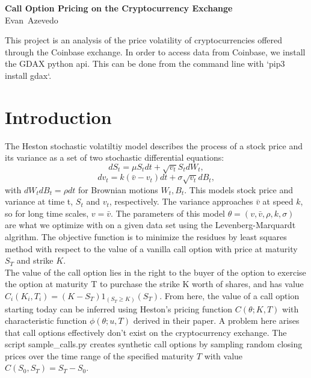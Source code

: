 \documentclass[12pt]{article}
\newcommand\thisis{Call Option Pricing on the Cryptocurrency Exchange}
\newcommand\theauthor{Evan~Azevedo}
\begin{document}
\thispagestyle{firstpg}

\noindent
{\sffamily\bfseries\huge \thisis}\\

\noindent
{\large\sffamily \theauthor}

\vspace*{20bp}

\noindent
This project is an analysis of the price volatility of cryptocurrencies offered through the Coinbase exchange.
In order to access data from Coinbase, we install the GDAX python api.
This can be done from the command line with `pip3 install gdax`.

\section{Introduction}
The Heston stochastic volatiltiy model describes the process of a stock price and its variance as a set of two stochastic differential equations:
\begin{equation}\label{eq:dS}
dS_{t} = \mu S_{t} dt + \sqrt{v_{t}} S_{t} dW_{t}, 
\end{equation}
\begin{equation}\label{eq:dv}
dv_{t} = k(\bar{v} - v_{t})dt + \sigma \sqrt{v_{t}} dB_{t},
\end{equation}
\noindent
with $dW_{t} dB_{t} = \rho dt$ for Brownian motions $W_t, B_t$.
This models stock price and variance at time t, $S_{t}$ and $v_{t}$, respectively.
The variance approaches $\bar{v}$ at speed $k$, so for long time scales, $v = \bar{v}$.
The parameters of this model $\theta = (v, \bar{v}, \rho, k, \sigma)$ are what we optimize with on a given data set using the Levenberg-Marquardt algrithm.
The objective function is to minimize the residues by least squares method with respect to the value of a vanilla call option with price at maturity $S_{T}$ and strike $K$. \\
The value of the call option lies in the right to the buyer of the option to exercise the option at maturity T to purchase the strike K worth of shares, and has value $C_{i}(K_i, T_i) = (K - S_T)1_{(S_T\geq K)}(S_T)$. 
From here, the value of a call option starting today can be inferred using Heston's pricing function $C(\theta; K, T)$ with characteristic function $\phi(\theta; u, T)$ derived in their paper. A problem here arises that call options effectively don't exist on the cryptocurrency exchange.
The script sample\_calls.py creates synthetic call options by sampling random closing prices over the time range of the specified maturity $T$ with value $C(S_0, S_T) = S_T - S_0$. \\
\end{document}

